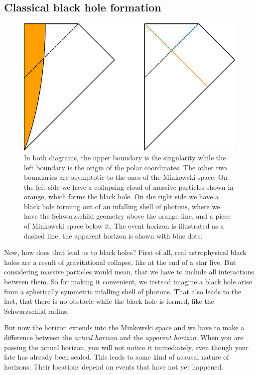 \subsection{Classical black hole formation \checkmark}
	\begin{figure}[tbp] 
		\begin{center}
			\includegraphics[scale=1]{collapse}
		\end{center}
			\caption{In both diagrams, the upper boundary is the singularity while the left boundary is the origin of the polar coordinates. The other two boundaries are asymptotic to the ones of the Minkowski space. On the left side we have a collapsing cloud of massive particles shown in orange, which forms the black hole. On the right side we have a black hole forming out of an infalling shell of photons, where we have the Schwarzschild geometry above the orange line, and a piece of Minkowski space below it. The event horizon is illustrated as a dashed line, the apparent horizon is shown with blue dots.}\label{collapse}
	\end{figure}	
	Now, how does that lead us to black holes? First of all, real astrophysical black holes are a result of gravitational collapse, like at the end of a star live. But considering massive particles would mean, that we have to include all interactions between them. So for making it convenient, we instead imagine a black hole arise from a spherically symmetric infalling shell of photons. 
	That also leads to the fact, that there is no obstacle while the black hole is formed, like the Schwarzschild radius.
		
	But now the horizon extends into the Minkowski space and we have to make a difference between the \textit{actual horizon} and the \textit{apparent horizon}.
	When you are passing the actual horizon, you will not notice it immediately, even though your fate has already been sealed. This leads to some kind of acausal nature of horizons: Their locations depend on events that have not yet happened. 
	
